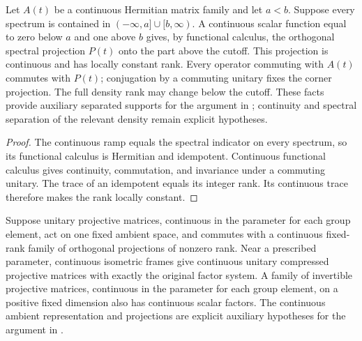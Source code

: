 \begin{lemma}
    \label{thm:spt_continuous_spectral_corner}
    \leanok
    Let $A(t)$ be a continuous Hermitian matrix family and let $a<b$.
    Suppose every spectrum is contained in
    $(-\infty,a]\cup[b,\infty)$. A continuous scalar function equal to
    zero below $a$ and one above $b$ gives, by functional calculus, the
    orthogonal spectral projection $P(t)$ onto the part above the cutoff.
    This projection is continuous and has locally constant rank.
    Every operator commuting with $A(t)$ commutes with $P(t)$; conjugation
    by a commuting unitary fixes the corner projection.
    The full density rank may change below the cutoff.
    These facts provide auxiliary separated supports for the argument in
    \cite[Appendix~C]{Schuch2011Phases}; continuity and spectral separation
    of the relevant density remain explicit hypotheses.
\end{lemma}

\begin{proof}\leanok
    The continuous ramp equals the spectral indicator on every spectrum,
    so its functional calculus is Hermitian and idempotent.
    Continuous functional calculus gives continuity, commutation, and
    invariance under a commuting unitary. The trace of an idempotent
    equals its integer rank. Its continuous trace therefore makes the
    rank locally constant.
\end{proof}

\begin{lemma}
    \label{thm:spt_continuous_invariant_compression}
    \leanok

    Suppose unitary projective matrices, continuous in the parameter for
    each group element, act
    on one fixed ambient space, and commutes with a continuous fixed-rank
    family of orthogonal projections of nonzero rank. Near a prescribed
    parameter, continuous isometric frames give continuous unitary
    compressed projective matrices with exactly the original factor system.
    A family of invertible projective matrices, continuous in the parameter
    for each group element, on a positive
    fixed dimension also has continuous scalar factors.
    The continuous ambient representation and projections are explicit
    auxiliary hypotheses for the argument in
    \cite[Appendix~C]{Schuch2011Phases}.
\end{lemma}

